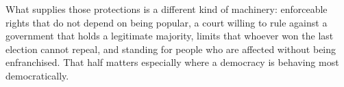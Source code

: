 What supplies those protections is a different kind of machinery: enforceable rights that do not depend on being popular, a court willing to rule against a government that holds a legitimate majority, limits that whoever won the last election cannot repeal, and standing for people who are affected without being enfranchised. That half matters especially where a democracy is behaving most democratically.
